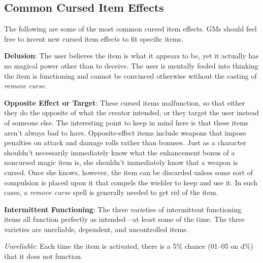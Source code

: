 \subsection{Common Cursed Item Effects}

				
The following are some of the most common cursed item effects. GMs should feel free to invent new cursed item effects to fit specific items. 
				
\textbf{Delusion}: The user believes the item is what it appears to be, yet it actually has no magical power other than to deceive. The user is mentally fooled into thinking the item is functioning and cannot be convinced otherwise without the casting of \textit{remove curse}.
				
\textbf{Opposite Effect or Target}: These cursed items malfunction, so that either they do the opposite of what the creator intended, or they target the user instead of someone else. The interesting point to keep in mind here is that these items aren't always bad to have. Opposite-effect items include weapons that impose penalties on attack and damage rolls rather than bonuses. Just as a character shouldn't necessarily immediately know what the enhancement bonus of a noncursed magic item is, she shouldn't immediately know that a weapon is cursed. Once she knows, however, the item can be discarded unless some sort of compulsion is placed upon it that compels the wielder to keep and use it. In such cases, a \textit{remove curse }spell is generally needed to get rid of the item.
				
\textbf{Intermittent Functioning}: The three varieties of intermittent functioning items all function perfectly as intended---at least some of the time. The three varieties are unreliable, dependent, and uncontrolled items.
				
\textit{Unreliable}: Each time the item is activated, there is a 5\% chance (01--05 on d\%) that it does not function.
				
